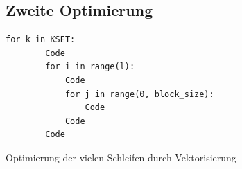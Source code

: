 \documentclass{beamer}
\begin{document}






\subsection{Zweite Optimierung}

\begin{frame}[fragile]
\begin{verbatim}
for k in KSET:
        Code
        for i in range(l):
            Code
            for j in range(0, block_size):
                Code
            Code
        Code
\end{verbatim}
Optimierung der vielen Schleifen durch Vektorisierung
\end{frame}
\end{document}
